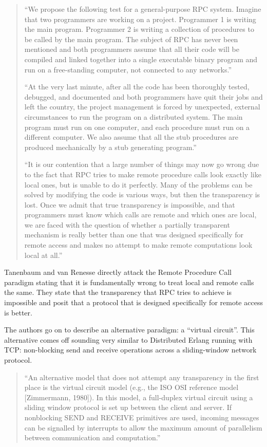 \begin{quote}
``We propose the following test for a general-purpose RPC system. Imagine that two programmers are working on a project. Programmer 1 is writing the main program. Programmer 2 is writing a collection of procedures to be called by the main program. The subject of RPC has never been mentioned and both programmers assume that all their code will be compiled and linked together into a single executable binary program and run on a free-standing computer, not connected to any networks.''	

``At the very last minute, after all the code has been thoroughly tested, debugged, and documented and both programmers have quit their jobs and left the country, the project management is forced by unexpected, external circumstances to run the program on a distributed system. The main program must run on one computer, and each procedure must run on a different computer. We also assume that all the stub procedures are produced mechanically by a stub generating program.''

``It is our contention that a large number of things may now go wrong due to the fact that RPC tries to make remote procedure calls look exactly like local ones, but is unable to do it perfectly. Many of the problems can be solved by modifying the code is various ways, but then the transparency is lost. Once we admit that true transparency is impossible, and that programmers must know which calls are remote and which ones are local, we are faced with the question of whether a partially transparent mechanism is really better than one that was designed specifically for remote access and makes no attempt to make remote computations look local at all.''
\end{quote}

Tanenbaum and van Renesse directly attack the Remote Procedure Call paradigm stating that it is fundamentally wrong to treat local and remote calls the same.  They state that the transparency that RPC tries to achieve is impossible and posit that a protocol that is designed specifically for remote access is better.

The authors go on to describe an alternative paradigm: a ``virtual circuit''.  This alternative comes off sounding very similar to Distributed Erlang running with TCP: non-blocking send and receive operations across a sliding-window network protocol.

\begin{quote}
``An alternative model that does not attempt any transparency in the first place is the virtual circuit model (e.g., the ISO OSI reference model [Zimmermann, 1980]). In this model, a full-duplex virtual circuit using a sliding window protocol is set up between the client and server. If nonblocking SEND and RECEIVE primitives are used, incoming messages can be signalled by interrupts to allow the maximum amount of parallelism between communication and computation.''
\end{quote}

